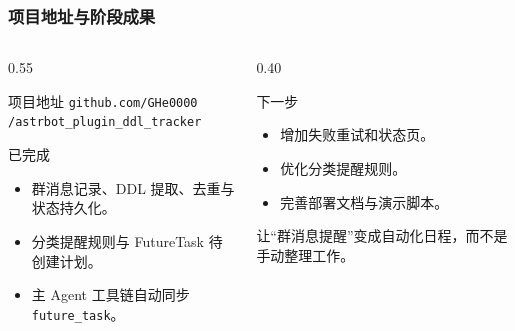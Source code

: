 \begin{frame}
  \frametitle{项目地址与阶段成果}
  \begin{columns}[T]
    \begin{column}{0.55\textwidth}
      \begin{block}{项目地址}
        \texttt{github.com/GHe0000}\\
        \texttt{/astrbot\_plugin\_ddl\_tracker}
      \end{block}
      \begin{block}{已完成}
        \begin{itemize}
          \item 群消息记录、DDL 提取、去重与状态持久化。
          \item 分类提醒规则与 FutureTask 待创建计划。
          \item 主 Agent 工具链自动同步 \texttt{future\_task}。
        \end{itemize}
      \end{block}
    \end{column}
    \begin{column}{0.40\textwidth}
      \begin{block}{下一步}
        \begin{itemize}
          \item 增加失败重试和状态页。
          \item 优化分类提醒规则。
          \item 完善部署文档与演示脚本。
        \end{itemize}
      \end{block}
      \begin{quoteBlock}
        让“群消息提醒”变成自动化日程，而不是手动整理工作。
      \end{quoteBlock}
    \end{column}
  \end{columns}
\end{frame}
